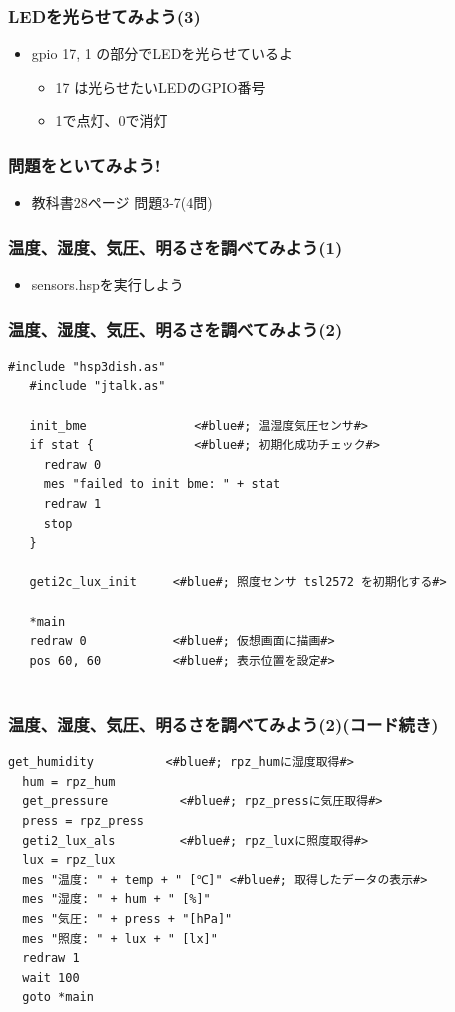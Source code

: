 \begin{frame}
  \frametitle{LEDを光らせてみよう(3)}
  \begin{itemize}
    \item gpio 17, 1 の部分でLEDを光らせているよ
          \begin{itemize}
            \item 17 は光らせたいLEDのGPIO番号
            \item 1で点灯、0で消灯
          \end{itemize}
  \end{itemize}
\end{frame}

\begin{frame}
  \frametitle{問題をといてみよう!}
  \begin{itemize}
    \item 教科書28ページ 問題3-7(4問)
  \end{itemize}
\end{frame}

\begin{frame}
  \frametitle{温度、湿度、気圧、明るさを調べてみよう(1)}
  \begin{itemize}
    \item sensors.hspを実行しよう
  \end{itemize}
\end{frame}

\begin{frame}[fragile]
  \frametitle{温度、湿度、気圧、明るさを調べてみよう(2)}
  \begin{lstlisting}[title=sensors.hsp, label=sensors.hsp]
   #include "hsp3dish.as"    
   #include "jtalk.as"    

   init_bme               <#blue#; 温湿度気圧センサ#>
   if stat {              <#blue#; 初期化成功チェック#>
     redraw 0          
     mes "failed to init bme: " + stat
     redraw 1
     stop
   }

   geti2c_lux_init     <#blue#; 照度センサ tsl2572 を初期化する#>

   *main
   redraw 0            <#blue#; 仮想画面に描画#>
   pos 60, 60          <#blue#; 表示位置を設定#>
  
  \end{lstlisting}
\end{frame}

\begin{frame}[fragile]
  \frametitle{温度、湿度、気圧、明るさを調べてみよう(2)(コード続き)}
  \begin{lstlisting}[title=sensors.hsp, label=sensors.hsp]
  get_humidity          <#blue#; rpz_humに湿度取得#>
  hum = rpz_hum       
  get_pressure          <#blue#; rpz_pressに気圧取得#>
  press = rpz_press
  geti2_lux_als         <#blue#; rpz_luxに照度取得#>
  lux = rpz_lux
  mes "温度: " + temp + " [℃]" <#blue#; 取得したデータの表示#>
  mes "湿度: " + hum + " [%]"
  mes "気圧: " + press + "[hPa]"
  mes "照度: " + lux + " [lx]"
  redraw 1              
  wait 100
  goto *main
  \end{lstlisting}
\end{frame}

